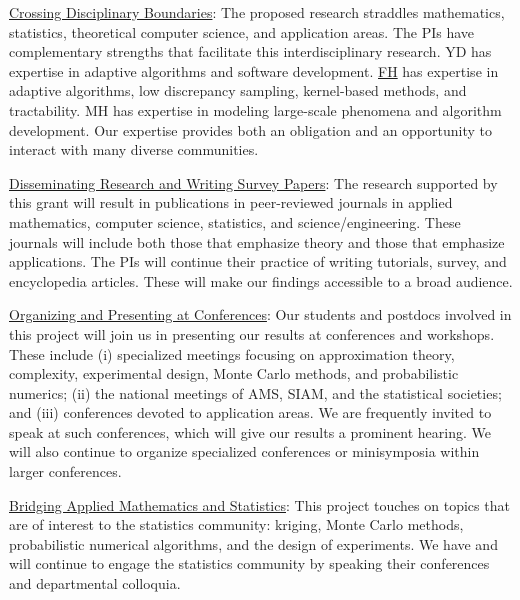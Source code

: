 \documentclass[11pt]{NSFamsart}
\newcommand{\Upara}[1]{\noindent\underline{\upshape #1}:}
\newcommand{\FH}{\hyperlink{FHlink}{FH}\xspace}
\begin{document}

\Upara{Crossing Disciplinary Boundaries} The proposed research straddles mathematics, statistics, theoretical computer science, and 
application areas. The PIs have complementary strengths that facilitate this interdisciplinary research. YD has expertise in adaptive algorithms and software development. \FH has expertise in adaptive algorithms, low discrepancy sampling, kernel-based methods, and tractability. MH has expertise in modeling large-scale phenomena and algorithm development. Our expertise provides both an obligation and an opportunity to interact with many diverse communities.

\Upara{Disseminating Research and Writing Survey Papers}
The research supported by this grant will result in publications in peer-reviewed journals in applied mathematics, computer science, statistics, and science/engineering. These 
journals will include both those that emphasize theory and those that emphasize applications. The PIs will continue their practice of writing tutorials, survey, and encyclopedia articles. These will make our findings accessible to a broad audience.


\Upara{Organizing and Presenting at Conferences}
Our students and postdocs involved in this project will join us in presenting our results at conferences and workshops. These include (i) specialized meetings focusing on approximation theory, complexity, 
experimental design, Monte Carlo methods, and probabilistic numerics; (ii) the national meetings of AMS, SIAM, and the statistical societies; and (iii) conferences devoted to application areas. We are frequently invited to speak at such conferences, which will give our results a prominent hearing. We will also continue to organize specialized conferences or minisymposia within larger conferences.

\Upara{Bridging Applied Mathematics and Statistics}
This project touches on topics that are of interest to the statistics community: kriging, Monte Carlo methods, probabilistic numerical algorithms, and the design of experiments. We have and will continue to engage the statistics community 
by speaking their conferences and departmental colloquia.
\end{document}
